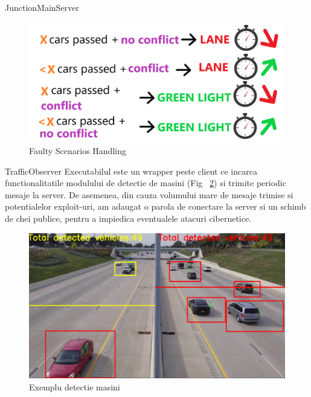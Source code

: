 \documentclass{beamer}
\begin{document}
    \begin{frame}{JunctionMainServer}    
        \begin{figure}[h!]
            \includegraphics[width=\textwidth]{Sketches/FaultyScenariosHandling.png}
            \caption{Faulty Scenarios Handling}
            \label{fig:Faulty Scenarios Handling}
        \end{figure}
    \end{frame}

    \begin{frame}{TrafficObserver}
        Executabilul este un wrapper peste client ce incarca functionalitatile modulului de 
        detectie de masini (Fig ~\ref{fig:Running client samples}) si trimite periodic mesaje la server.
        De asemenea, din cauza volumului mare de mesaje trimise si potentialelor exploit-uri, 
        am adaugat o parola de conectare la server si un schimb de chei publice, pentru 
        a impiedica eventualele atacuri cibernetice.
        \begin{figure}[h!]
            \includegraphics[width=(\textwidth / 3) * 2]{TrafficDetectionRunningExample2.png}
            \caption{Exemplu detectie masini }
            \label{fig:Running client samples}
        \end{figure}

        
    \end{frame}
\end{document}
